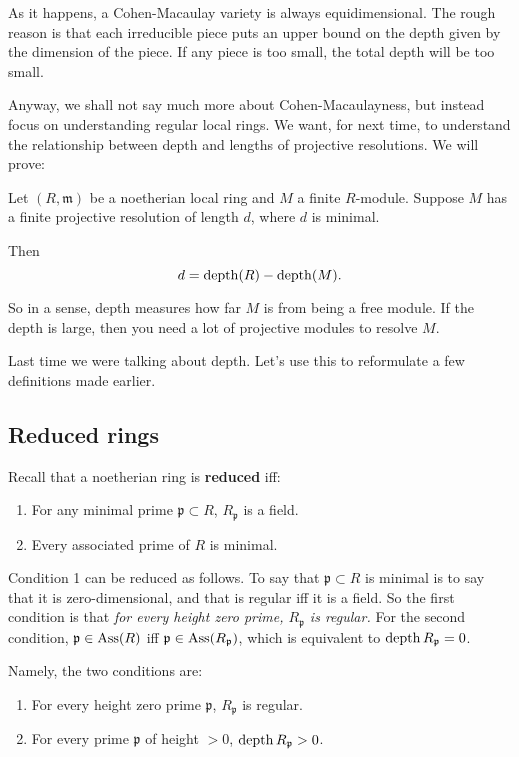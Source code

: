 As it happens, a Cohen-Macaulay variety is always
equidimensional. The rough
reason is that each irreducible piece puts an upper bound on the
depth given by
the dimension of the piece. If any piece is too small, the total
depth will be
too small.

Anyway, we shall not say much more about Cohen-Macaulayness, but
instead focus
on understanding regular local rings. We want, for next time,
to understand the relationship
between depth and lengths of projective resolutions.
We will prove:

\begin{theorem} Let $(R,
\mathfrak{m})$ be a
noetherian local ring and $M$ a finite $R$-module. Suppose $M$
has a finite
projective resolution of length $d$, where $d$ is minimal.

Then
\[ d = \operatorname{depth}(R) - \operatorname{depth}(M).  \]
\end{theorem}
So in a sense, depth measures how far $M$ is from being a free
module. If the
depth is large, then you need a lot of projective modules to
resolve $M$.

Last time we were talking about depth. Let's use this to
reformulate a few
definitions made earlier.

\subsection{Reduced rings}
Recall that a noetherian ring is \textbf{reduced} iff:
\begin{enumerate}
\item For any minimal prime $\mathfrak{p} \subset R$,
$R_{\mathfrak{p}}$ is a
field.
\item Every associated prime of $R$ is minimal.
\end{enumerate}

Condition 1 can be reduced as follows. To say that
$\mathfrak{p}\subset R$ is
minimal is to say that it is zero-dimensional, and that is
regular iff it is a
field. So the first condition is that \emph{for every height
zero prime,
$R_{\mathfrak{p}}$ is regular.} For the second condition,
$\mathfrak{p} \in
\operatorname{Ass}(R)$ iff $\mathfrak{p} \in \operatorname{Ass}(R_{\mathfrak{p}})$, which is
equivalent to
$\operatorname{depth} R_{\mathfrak{p}} = 0$.

Namely, the two conditions are:
\begin{enumerate}
\item For every height zero prime $\mathfrak{p} $,
$R_{\mathfrak{p}}$ is
regular.
\item For every prime $\mathfrak{p}$ of height $>0$, $\operatorname{depth}
R_{\mathfrak{p}} >
0$.
\end{enumerate}


